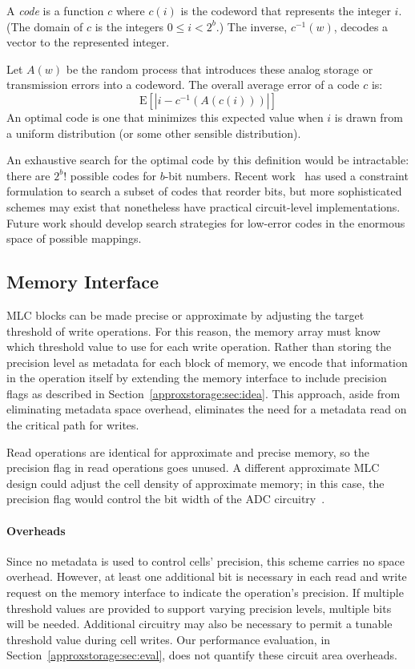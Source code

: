 A \emph{code} is a function $c$ where $c(i)$ is the codeword that
represents the integer $i$. (The domain of $c$ is the integers $0 \le i <
2^b$.) The inverse, $c^{-1}(w)$, decodes a vector to the represented integer.

Let $A(w)$ be the random process that introduces these analog storage or
transmission errors into a codeword.
The overall average error of a code $c$ is:
%
$$\mathrm{E}\!\left[ |i - c^{-1}(A(c(i)))| \right]$$
%
An optimal code is one that minimizes this expected value when $i$
is drawn from a
uniform distribution (or some other sensible distribution).

An exhaustive search for the optimal code by this definition would be
intractable: there are $2^b!$ possible codes for $b$-bit numbers.
Recent work~\cite{holcomb-wacas} has used a constraint formulation to search a
subset of codes that reorder bits, but more sophisticated schemes
may exist that nonetheless have practical circuit-level implementations.
Future work should develop search strategies for low-error codes in
the enormous space of possible mappings.


\subsection{Memory Interface}

MLC blocks can be made precise or approximate by adjusting the target threshold of write
operations. For this reason, the memory array must know which threshold value
to use for each write operation. Rather than storing the precision level as
metadata for each block of memory, we encode that information in the operation itself by extending the memory interface to include
precision flags as described in Section~\ref{approxstorage:sec:idea}. This approach, aside
from eliminating metadata space overhead, eliminates the need for a metadata
read on the critical path for writes.

Read operations are identical for approximate and precise memory, so the
precision flag in read operations goes unused. A different approximate MLC
design could adjust the cell density of approximate memory; in this case, the
precision flag would control the bit width of the ADC
circuitry~\cite{morphablepcm}.

\paragraph{Overheads}

Since no metadata is used to control cells' precision, this scheme carries no
space overhead. However, at least one additional bit is necessary in each read
and write request on the memory interface to indicate the operation's
precision. If multiple threshold values are provided to support varying precision
levels, multiple bits will be needed. Additional circuitry may also be
necessary to permit a tunable threshold value during cell writes. Our performance
evaluation, in Section~\ref{approxstorage:sec:eval}, does not quantify these circuit area overheads.

